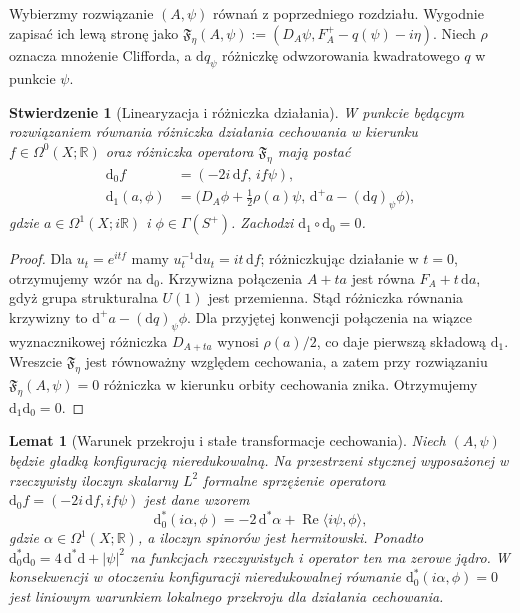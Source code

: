\documentclass[11pt,a4paper]{report}
\numberwithin{equation}{section}
\theoremstyle{plain}
\newtheorem{lemat}[twierdzenie]{Lemat}
\newtheorem{stwierdzenie}[twierdzenie]{Stwierdzenie}
\theoremstyle{definition}
\theoremstyle{remark}
\begin{document}
Wybierzmy rozwiązanie $(A,\psi)$ równań z poprzedniego
rozdziału. Wygodnie zapisać ich lewą stronę jako
$\mathfrak F_\eta(A,\psi):=(D_A\psi,F_A^+-q(\psi)-i\eta)$.
Niech $\rho$ oznacza mnożenie Clifforda, a
$\mathrm dq_\psi$ różniczkę odwzorowania kwadratowego $q$
w punkcie $\psi$.

\begin{stwierdzenie}[Linearyzacja i różniczka działania]
\label{prop:tg-sw-linear}
W punkcie będącym rozwiązaniem równania różniczka działania
cechowania w kierunku $f\in\Omega^0(X;\mathbb R)$ oraz
różniczka operatora $\mathfrak F_\eta$ mają postać
\[
\begin{aligned}
\mathrm d_0f&=(-2i\,\mathrm df,\,if\psi),\\
\mathrm d_1(a,\phi)&=\bigl(D_A\phi+\tfrac12\rho(a)\psi,\,
\mathrm d^+a-(\mathrm dq)_\psi\phi\bigr),
\end{aligned}
\]
gdzie $a\in\Omega^1(X;i\mathbb R)$ i $\phi\in\Gamma(S^+)$.
Zachodzi $\mathrm d_1\circ\mathrm d_0=0$.
\end{stwierdzenie}

\begin{proof}
Dla $u_t=e^{itf}$ mamy
$u_t^{-1}\mathrm du_t=it\,\mathrm df$; różniczkując działanie
w $t=0$, otrzymujemy wzór na $\mathrm d_0$.
Krzywizna połączenia $A+ta$ jest równa
$F_A+t\,\mathrm da$, gdyż grupa strukturalna $U(1)$
jest przemienna. Stąd różniczka równania krzywizny
to $\mathrm d^+a-(\mathrm dq)_\psi\phi$.
Dla przyjętej konwencji połączenia na wiązce wyznacznikowej
różniczka $D_{A+ta}$ wynosi $\rho(a)/2$, co daje
pierwszą składową $\mathrm d_1$.
Wreszcie $\mathfrak F_\eta$ jest równoważny względem
cechowania, a zatem przy rozwiązaniu
$\mathfrak F_\eta(A,\psi)=0$ różniczka w kierunku orbity
cechowania znika. Otrzymujemy $\mathrm d_1\mathrm d_0=0$.
\end{proof}

\begin{lemat}[Warunek przekroju i stałe transformacje cechowania]
\label{lem:tg-sw-full-coulomb}
Niech $(A,\psi)$ będzie gładką konfiguracją nieredukowalną.
Na przestrzeni stycznej wyposażonej w rzeczywisty iloczyn
skalarny $L^2$ formalne sprzężenie operatora
$\mathrm d_0f=(-2i\,\mathrm df,if\psi)$ jest dane wzorem
\[
\mathrm d_0^*(i\alpha,\phi)
=-2\,\mathrm d^*\alpha
+\operatorname{Re}\langle i\psi,\phi\rangle,
\]
gdzie $\alpha\in\Omega^1(X;\mathbb R)$, a iloczyn
spinorów jest hermitowski. Ponadto
$\mathrm d_0^*\mathrm d_0=4\,\mathrm d^*\mathrm d+|\psi|^2$
na funkcjach rzeczywistych i operator ten ma zerowe jądro.
W konsekwencji w otoczeniu konfiguracji nieredukowalnej
równanie $\mathrm d_0^*(i\alpha,\phi)=0$ jest liniowym
warunkiem lokalnego przekroju dla działania cechowania.
\end{lemat}
\end{document}
